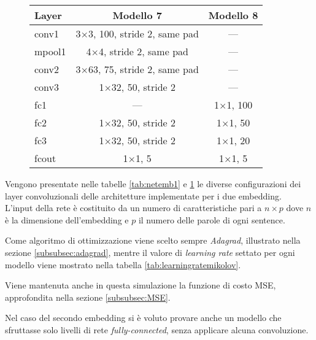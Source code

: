 \begin{figure}[H]
	\centering
	\begin{tabular}{lcc}
		\toprule
		\textbf{Layer}& \textbf{Modello 7} 								  & \textbf{Modello 8} 			   \\ 
		\midrule
		conv1 	& \num{3}$\times$\num{3}, 100, stride 2, same pad     & ---	   \\
		mpool1 	& \num{4}$\times$\num{4}, stride 2, same pad		  & ---	   \\
		conv2  	& \num{3}$\times$\num{63}, 75, stride 2, same pad	  & ---    \\
		conv3  	& \num{1}$\times$\num{32}, 50, stride 2	  				  & ---	   \\
		fc1  	& ---													  & \num{1}$\times$\num{1}, 100	   \\
		fc2  	& \num{1}$\times$\num{32}, 50, stride 2	  				  & \num{1}$\times$\num{1},  50    \\
		fc3  	& \num{1}$\times$\num{32}, 50, stride 2	  				  & \num{1}$\times$\num{1},  20	   \\
		fcout	& \num{1}$\times$\num{1}, 5   			  				  & \num{1}$\times$\num{1},   5	   \\
		\bottomrule	
	\end{tabular}
	\label{tab:netemb2}
\end{figure}

Vengono presentate nelle tabelle \ref{tab:netemb1} e \ref{tab:netemb2} le diverse configurazioni dei layer convoluzionali delle architetture implementate per i due embedding.\\

L'input della rete è costituito da un numero di caratteristiche pari a $n \times p$ dove $n$ è la dimensione dell'embedding e $p$ il numero delle parole di ogni sentence.

Come algoritmo di ottimizzazione viene scelto sempre \emph{Adagrad}, illustrato nella sezione \ref{subsubsec:adagrad}, mentre il valore di \emph{learning rate} settato per ogni modello viene mostrato nella tabella \ref{tab:learningratemikolov}.

Viene mantenuta anche in questa simulazione la funzione di costo MSE, approfondita nella sezione \ref{subsubsec:MSE}.

Nel caso del secondo embedding si è voluto provare anche un modello che sfruttasse solo livelli di rete \emph{fully-connected}, senza applicare alcuna convoluzione. 


